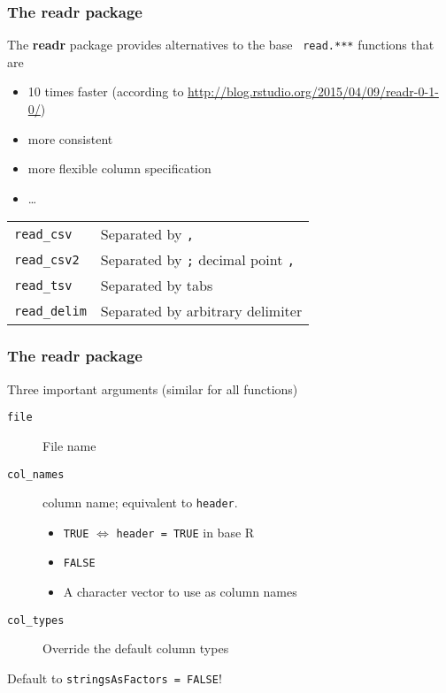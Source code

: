 \documentclass[paper=screen,mathserif]{beamer}\usepackage[]{graphicx}\usepackage[]{color}
\newcommand{\ft}[1]{\frametitle{#1}}
\begin{document}
\begin{frame}[fragile]
  \ft{The {\bf readr} package}
  
  The {\bf readr} package provides alternatives to the base {\tt
    read.***} functions that are
  \begin{itemize}
  \item 10 times faster (according to
    \url{http://blog.rstudio.org/2015/04/09/readr-0-1-0/})
  \item more consistent
  \item more flexible column specification
  \item \dots
  \end{itemize}
  \begin{center}
    \begin{tabular}{p{4cm}p{6cm}}
      {\tt read\_csv}   & Separated by {\tt ,} \\
      {\tt read\_csv2}  & Separated by {\tt ;} decimal point {\tt ,} \\
      {\tt read\_tsv} & Separated by tabs    \\
      {\tt read\_delim} & Separated by arbitrary delimiter    \\
    \end{tabular}
  \end{center}
\end{frame}

\begin{frame}[fragile]
  \ft{The {\bf readr} package}
  
  Three important arguments (similar for all functions)
  \begin{description}
  \item[{\tt file}] File name
  \item[{\tt col\_names}] column name; equivalent to {\tt header}.
    \begin{itemize}
    \item {\tt TRUE} $\Leftrightarrow$ \verb|header = TRUE| in base R
    \item {\tt FALSE}
    \item A character vector to use as column names
    \end{itemize}
  \item[{\tt col\_types}] Override the default column types
  \end{description}\vspace{0.6cm}
  Default to \verb|stringsAsFactors = FALSE|!
\end{frame}
\end{document}
